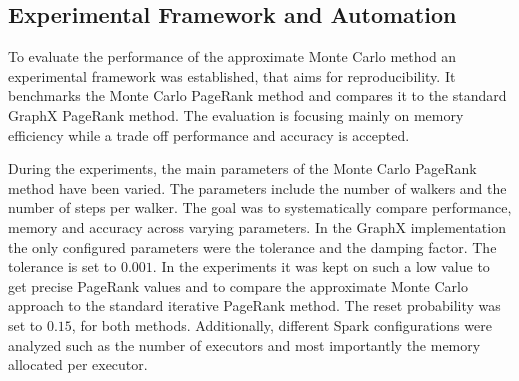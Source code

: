 \subsection{Experimental Framework and Automation}


To evaluate the performance of the approximate Monte Carlo method an experimental framework was established, that aims for reproducibility. It benchmarks the Monte Carlo PageRank method and compares it to the standard GraphX PageRank method. The evaluation is focusing mainly on memory efficiency while a trade off performance and accuracy is accepted. \par

During the experiments, the main parameters of the Monte Carlo PageRank method have been varied. The parameters include the number of walkers and the number of steps per walker. The goal was to systematically compare performance, memory and accuracy across varying parameters. In the GraphX implementation the only configured parameters were the tolerance and the damping factor. The tolerance is set to $0.001$. In the experiments it was kept on such a low value to get precise PageRank values and to compare the approximate Monte Carlo approach to the standard iterative PageRank method. The reset probability was set to $0.15$, for both methods. Additionally, different Spark configurations were analyzed such as the number of executors and most importantly the memory allocated per executor. \par

